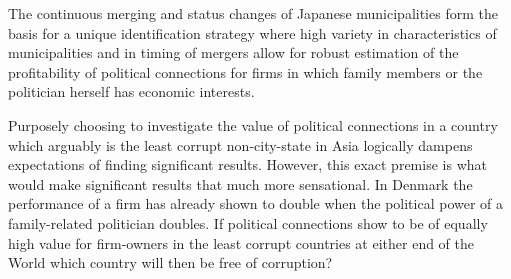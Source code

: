 \label{sec:conclusion}
The continuous merging and status changes of Japanese municipalities form the basis for a unique identification strategy where high variety in characteristics of municipalities and in timing of mergers allow for robust estimation of the profitability of political connections for firms in which family members or the politician herself has economic interests.

Purposely choosing to investigate the value of political connections in a country which arguably is the least corrupt non-city-state in Asia logically dampens expectations of finding significant results. However, this exact premise is what would make significant results that much more sensational. In Denmark the performance of a firm has already shown to double when the political power of a family-related politician doubles. If political connections show to be of equally high value for firm-owners in the least corrupt countries at either end of the World which country will then be free of corruption?
